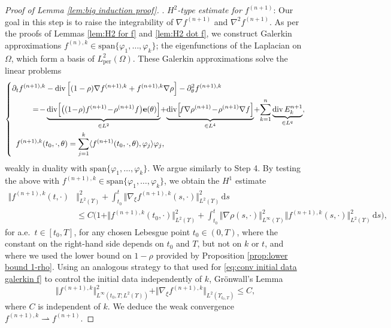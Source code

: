 \documentclass[11pt,a4paper,reqno]{amsart}
\theoremstyle{remark}
\theoremstyle{definition}
\numberwithin{equation}{section}
\newcommand{\per}{\mathrm{per}}
\DeclareMathOperator{\dv}{div}
\renewcommand{\span}{\mathrm{span}}
\newcommand{\e}{{\bf e}}
\newcommand{\bxi}{\xi}
\renewcommand{\d}{\, \mathrm{d} }
\newcommand{\ff}[1]{f^{(#1)}}
\newcommand{\rr}[1]{\rho^{(#1)}}
\def\de{\partial}
\begin{document}
\begin{proof}[Proof of Lemma \ref{lem:big induction proof}]
\smallskip 

. \textit{$H^2$-type estimate for $f^{(n+1)}$}:  Our goal in this step is to raise the integrability of $\nabla f^{(n+1)}$ and $\nabla^2 f^{(n+1)}$. As per the proofs of Lemmas \ref{lem:H2 for f} and \ref{lem:H2 dot f}, we construct Galerkin approximations $f^{(n),k} \in \span\{\varphi_1,\dots,\varphi_k\}$; the eigenfunctions of the Laplacian on $\Omega$, which form a basis of $L^2_\per(\Omega)$. These Galerkin approximations solve the linear problems 
\begin{equation*}
  \left\lbrace  \begin{aligned}
    \de_t f^{(n+1),k}& - \dv\Big[ (1-\rho)\nabla f^{(n+1),k} + f^{(n+1),k}\nabla \rho \Big]  - \partial^2_\theta f^{(n+1),k} \\ 
     = \!- &\underbrace{\dv \! \Big[
    \big( (1\!-\! \rho) \ff{n+1}\! -\!\rr{n+1} f
    \big) \e(\theta)
    \Big]}_{\in L^2}\! +\! \underbrace{\dv\!\Big[\! f\nabla \rr{n+1}  \!-\!\rr{n+1}\nabla f \Big]}_{\in L^4 } \! + \!\sum_{k=1}^{n} \underbrace{\dv E^{n+1}_k}_{\in L^q}, \\ 
    f^{(n+1),k}(&t_0,\cdot,\theta) = \sum_{j=1}^k \langle f^{(n+1)}(t_0,\cdot,\theta) , \varphi_j \rangle \varphi_j, 
\end{aligned}\right. 
\end{equation*}
weakly in duality with $\span\{\varphi_1,\dots,\varphi_k\}$. We argue similarly to Step 4. By testing the above with $f^{(n+1),k} \in \span\{\varphi_1,\dots,\varphi_k\}$, we obtain the $H^1$ estimate 
\begin{equation*}
   \begin{aligned}
       \Vert f^{(n+1),k}(t,\cdot) & \Vert^2_{L^2(\Upsilon)} + \int_{t_0}^t \Vert \nabla_{\bxi} f^{(n+1),k}(s,\cdot) \Vert^2_{L^2(\Upsilon)} \d s \\ 
       &\leq C\Big( 1 + \Vert f^{(n+1),k}(t_0,\cdot)\Vert^2_{L^2(\Upsilon)} + \int_{t_0}^t \Vert \nabla \rho (s,\cdot) \Vert^2_{L^\infty(\Upsilon)} \Vert f^{(n+1),k} (s,\cdot) \Vert^2_{L^2(\Upsilon)} \d s \Big), 
   \end{aligned}
\end{equation*}
for a.e.~$t \in [t_0,T]$, for any chosen Lebesgue point $t_0 \in (0,T)$, where the constant on the right-hand side depends on $t_0$ and $T$, but not on $k$ or $t$, and where we used the lower bound on $1-\rho$ provided by Proposition \ref{prop:lower bound 1-rho}. Using an analogous strategy to that used for \eqref{eq:conv initial data galerkin f} to control the initial data independently of $k$, Gr\"onwall's Lemma 
\begin{equation*}
  \Vert f^{(n+1),k} \Vert^2_{L^\infty(t_0,T;L^2(\Upsilon))} + \Vert \nabla_{\bxi} f^{(n+1),k} \Vert_{L^2(\Upsilon_{t_0,T})} \leq C, 
\end{equation*}
where $C$ is independent of $k$. We deduce the weak convergence $f^{(n+1),k} \rightharpoonup f^{(n+1)}$. 


\end{proof}
\end{document}
